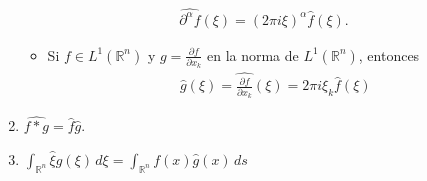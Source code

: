 \begin{theorem}{}
\begin{enumerate}
\begin{align*}
          \hat{\partial^{\alpha}f}(\xi)=(2\pi i\xi)^{\alpha}\hat{f}(\xi).
        \end{align*}
        \begin{itemize}
          \item Si $f\in L^{1}(\mathbb{R}^{n})$ y $g=\frac{\partial f}{\partial x_k}$ en la norma de $L^1(\mathbb{R}^{n})$, entonces
            \begin{align*}
              \hat{g}(\xi)=\hat{\frac{\partial f}{\partial x_k}}(\xi)=2\pi i\xi_{k}\hat{f}(\xi)
            \end{align*}
        \end{itemize}
      \item $\hat{f*g}=\hat{f}\hat{g}$.
      \item $\int_{\mathbb{R}^{n}}\hat{\xi}g(\xi)\,d\xi=\int_{\mathbb{R}^{n}}f(x)\hat{g}(x)\,ds$
    \end{enumerate}
  \end{theorem}
